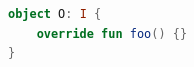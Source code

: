 {{{{{{{{{{{{\begin{lstlisting}[language=Kotlin]
object O: I {
    override fun foo() {}
}
\end{lstlisting}




































































































































}}}}}}}}}}}}
